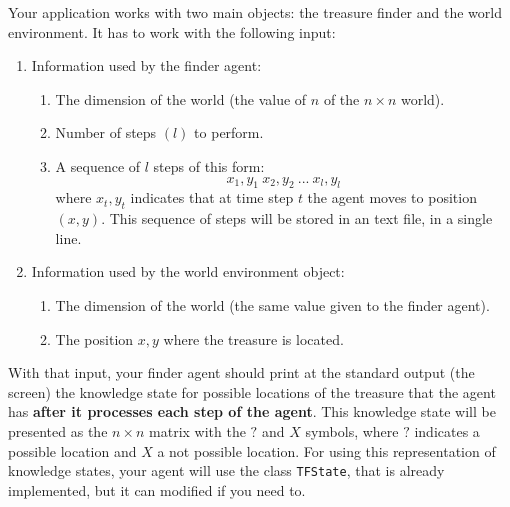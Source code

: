 \documentclass{tufte-handout}
\begin{document}
\begin{fullwidth}
Your application works with two main objects: the treasure finder and the world environment. It has to work with the following input:
\begin{enumerate}
\item Information used by the finder agent:
\begin{enumerate}
\item The dimension of the world (the value of $n$ of the $n \times n$ world).
\item Number of steps $(l)$ to perform.
\item A sequence of $l$ steps of this form:
$$
 x_1,y_1 \ x_2,y_2 \ ... \ x_l,y_l
$$
where $ x_t,y_t $ indicates that at time step $t$ the agent moves
 to position $(x,y)$.
This sequence of steps will be stored in an text file, in a single line.
\end{enumerate}
\item Information used by the  world environment object:
\begin{enumerate}
\item The dimension of the world (the same value given to the finder agent).
\item The position $x,y$ where the treasure is located.
\end{enumerate}
\end{enumerate}




With that input, your finder agent should print at the standard output
 (the screen)
the knowledge state for possible locations of the treasure that the agent
has {\bf after it processes each step of the agent}.
This knowledge state will be presented as the $n \times n$
matrix with the $?$ and $X$ symbols, where $?$ indicates a possible location
and $X$ a not possible location. For using this representation of knowledge states, your
agent will use the class {\tt TFState}, that is already implemented, but it can
modified if you need to.
\end{fullwidth}


\end{document}
